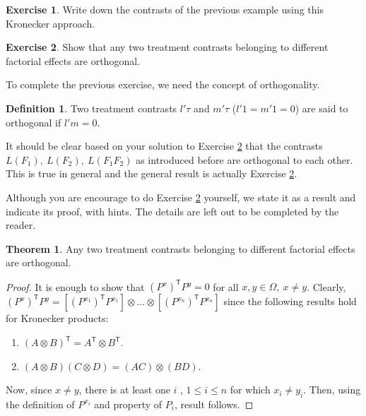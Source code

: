 \documentclass[12pt]{article}
\newcommand{\transpose}{\mathsf{T}}
\theoremstyle{definition}
\newtheorem{thm}{Theorem}
\newtheorem{defn}{Definition}
\newtheorem{ex}{Exercise}
\newenvironment{definition}{
\begin{tcolorbox}[colback=green!5!white,colframe=green!75!black, parbox = false]\begin{defn} }{\end{defn}\end{tcolorbox} }
\newenvironment{theorem}{
\begin{tcolorbox}[colback=green!5!white,colframe=green!75!black, parbox = false]\begin{thm} }{\end{thm}\end{tcolorbox} }
\newenvironment{note}{
\begin{tcolorbox}[colback=blue!5!white,colframe=blue!75!black,title=Note, parbox = false] }{\end{tcolorbox} }
\newenvironment{exercise}{
\begin{tcolorbox}[colback=red!5!white,colframe=red!75!black, parbox = false]\begin{ex} }{\end{ex}\end{tcolorbox} }
\begin{document}
\begin{exercise}
    Write down the contrasts of the previous example using this Kronecker approach.
\end{exercise}

\begin{exercise}
    Show that any two treatment contrasts belonging to  different factorial effects are orthogonal.
    \label{exe:factorial-orthogonal}
\end{exercise}


To complete the previous exercise, we need the concept of orthogonality.

\begin{definition}
    Two treatment contrasts $l'\tau$ and $m'\tau$  ($l'1=m'1=0$) are said to orthogonal if $l'm=0$.
\end{definition}

It should be clear based on your solution to Exercise \ref{exe:factorial-orthogonal} that the contrasts $L(F_1), \ L(F_2), \ L(F_1F_2)$ as introduced before are orthogonal to each other. This is true in general and the  general result is actually Exercise \ref{exe:factorial-orthogonal}. 

\begin{note}
    Although you are encourage to do Exercise \ref{exe:factorial-orthogonal} yourself, we state it as a result and indicate its proof, with hints. The details are left out to be completed by the reader.
\end{note}

\begin{theorem}
    Any two treatment contrasts belonging to different factorial effects are orthogonal.
    \label{thm:result1-note4}
\end{theorem}

\begin{proof}
    It is enough to show that $(P^x)^{\transpose}P^y=0$ for all $x, y \in \Omega, \ x\neq y$. Clearly, $(P^x)^{\transpose}P^y = [(P^{x_1})^{\transpose} P^{x_1}] \otimes \ldots \otimes [(P^{x_n})^{\transpose} P^{x_n}] $ since the following results hold for Kronecker products:
    \begin{enumerate}
        \item $(A\otimes B)^{\transpose} = A^{\transpose}\otimes B^{\transpose}$.
        \item $(A\otimes B)(C\otimes D)= (AC)\otimes (BD)$.
    \end{enumerate}
    
	Now, since $x\neq y$, there is at least one $i$ , $1\leq i\leq n$ for which $x_i
	\neq y_i$. Then, using the definition of $P^{x_i}$ and property of $P_i$, result follows.
\end{proof}
\end{document}
